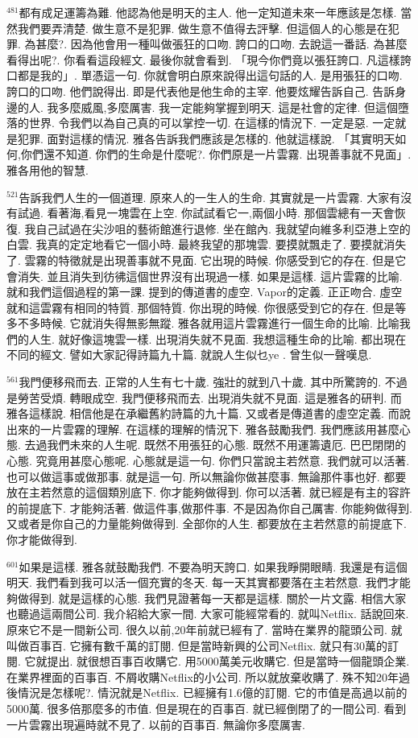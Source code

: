 \documentclass{book}
\begin{document}
$^{481}$都有成足運籌為難.
他認為他是明天的主人.
他一定知道未來一年應該是怎樣.
當然我們要弄清楚.
做生意不是犯罪.
做生意不值得去評擊.
但這個人的心態是在犯罪.
為甚麼?.
因為他會用一種叫做張狂的口吻.
誇口的口吻.
去說這一番話.
為甚麼看得出呢?.
你看看這段經文.
最後你就會看到.
「現今你們竟以張狂誇口.
凡這樣誇口都是我的」.
單憑這一句.
你就會明白原來說得出這句話的人.
是用張狂的口吻.
誇口的口吻.
他們說得出.
即是代表他是他生命的主宰.
他要炫耀告訴自己.
告訴身邊的人.
我多麼威風,多麼厲害.
我一定能夠掌握到明天.
這是社會的定律.
但這個墮落的世界.
令我們以為自己真的可以掌控一切.
在這樣的情況下.
一定是惡.
一定就是犯罪.
面對這樣的情況.
雅各告訴我們應該是怎樣的.
他就這樣說.
「其實明天如何,你們還不知道.
你們的生命是什麼呢?.
你們原是一片雲霧.
出現善事就不見面」.
雅各用他的智慧.

$^{521}$告訴我們人生的一個道理.
原來人的一生人的生命.
其實就是一片雲霧.
大家有沒有試過.
看著海,看見一塊雲在上空.
你試試看它一,兩個小時.
那個雲總有一天會恢復.
我自己試過在尖沙咀的藝術館進行退修.
坐在館內.
我就望向維多利亞港上空的白雲.
我真的定定地看它一個小時.
最終我望的那塊雲.
要摸就飄走了.
要摸就消失了.
雲霧的特徵就是出現善事就不見面.
它出現的時候.
你感受到它的存在.
但是它會消失.
並且消失到彷彿這個世界沒有出現過一樣.
如果是這樣.
這片雲霧的比喻.
就和我們這個過程的第一課.
提到的傳道書的虛空.
Vapor的定義.
正正吻合.
虛空就和這雲霧有相同的特質.
那個特質.
你出現的時候.
你很感受到它的存在.
但是等多不多時候.
它就消失得無影無蹤.
雅各就用這片雲霧進行一個生命的比喻.
比喻我們的人生.
就好像這塊雲一樣.
出現消失就不見面.
我想這種生命的比喻.
都出現在不同的經文.
譬如大家記得詩篇九十篇.
就說人生似乜ye .
曾生似一聲嘆息.

$^{561}$我門便移飛而去.
正常的人生有七十歲.
強壯的就到八十歲.
其中所驚誇的.
不過是勞苦受煩.
轉眼成空.
我門便移飛而去.
出現消失就不見面.
這是雅各的研判.
而雅各這樣說.
相信他是在承繼舊約詩篇的九十篇.
又或者是傳道書的虛空定義.
而說出來的一片雲霧的理解.
在這樣的理解的情況下.
雅各鼓勵我們.
我們應該用甚麼心態.
去過我們未來的人生呢.
既然不用張狂的心態.
既然不用運籌遺厄.
巴巴閉閉的心態.
究竟用甚麼心態呢.
心態就是這一句.
你們只當說主若然意.
我們就可以活著.
也可以做這事或做那事.
就是這一句.
所以無論你做甚麼事.
無論那件事也好.
都要放在主若然意的這個類別底下.
你才能夠做得到.
你可以活著.
就已經是有主的容許的前提底下.
才能夠活著.
做這件事,做那件事.
不是因為你自己厲害.
你能夠做得到.
又或者是你自己的力量能夠做得到.
全部你的人生.
都要放在主若然意的前提底下.
你才能做得到.

$^{601}$如果是這樣.
雅各就鼓勵我們.
不要為明天誇口.
如果我睜開眼睛.
我還是有這個明天.
我們看到我可以活一個充實的冬天.
每一天其實都要落在主若然意.
我們才能夠做得到.
就是這樣的心態.
我們見證著每一天都是這樣.
關於一片文露.
相信大家也聽過這兩間公司.
我介紹給大家一間.
大家可能經常看的.
就叫Netflix.
話說回來.
原來它不是一間新公司.
很久以前,20年前就已經有了.
當時在業界的龍頭公司.
就叫做百事百.
它擁有數千萬的訂閱.
但是當時新興的公司Netflix.
就只有30萬的訂閱.
它就提出.
就很想百事百收購它.
用5000萬美元收購它.
但是當時一個龍頭企業.
在業界裡面的百事百.
不屑收購Netflix的小公司.
所以就放棄收購了.
殊不知20年過後情況是怎樣呢?.
情況就是Netflix.
已經擁有1.6億的訂閱.
它的市值是高過以前的5000萬.
很多倍那麼多的市值.
但是現在的百事百.
就已經倒閉了的一間公司.
看到一片雲霧出現遍時就不見了.
以前的百事百.
無論你多麼厲害.
\end{document}

